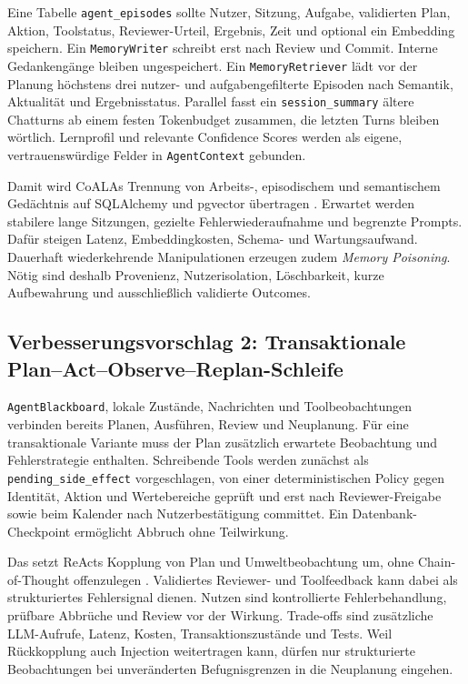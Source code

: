 Eine Tabelle \texttt{agent\_episodes} sollte Nutzer, Sitzung, Aufgabe,
validierten Plan, Aktion, Toolstatus, Reviewer-Urteil, Ergebnis, Zeit und
optional ein Embedding speichern. Ein \texttt{MemoryWriter} schreibt erst nach
Review und Commit. Interne Gedankengänge bleiben ungespeichert. Ein
\texttt{Memory\allowbreak{}Retriever}
lädt vor der Planung höchstens drei nutzer- und aufgabengefilterte Episoden nach
Semantik, Aktualität und Ergebnisstatus. Parallel fasst ein
\texttt{session\_summary} ältere Chatturns ab einem festen Tokenbudget zusammen,
die letzten Turns bleiben wörtlich. Lernprofil und relevante Confidence Scores
werden als eigene, vertrauenswürdige Felder in \texttt{AgentContext} gebunden.

Damit wird CoALAs Trennung von Arbeits-, episodischem und semantischem
Gedächtnis auf SQLAlchemy und pgvector übertragen \parencite{sumersEtAl2024}.
Erwartet werden stabilere lange Sitzungen, gezielte Fehlerwiederaufnahme und
begrenzte Prompts. Dafür steigen Latenz, Embeddingkosten, Schema- und
Wartungsaufwand. Dauerhaft wiederkehrende Manipulationen erzeugen zudem
\emph{Memory Poisoning}. Nötig sind deshalb Provenienz, Nutzerisolation,
Löschbarkeit, kurze Aufbewahrung und ausschließlich validierte Outcomes.

\subsection{Verbesserungsvorschlag 2: Transaktionale Plan--Act--Observe--Replan-Schleife}
\label{sec:verbesserung-zwei}

\texttt{AgentBlackboard}, lokale Zustände, Nachrichten und Toolbeobachtungen
verbinden bereits Planen, Ausführen, Review und Neuplanung. Für eine
transaktionale Variante muss der Plan zusätzlich erwartete Beobachtung und
Fehlerstrategie enthalten. Schreibende Tools werden zunächst als
\texttt{pending\_side\_effect} vorgeschlagen, von einer
deterministischen Policy gegen Identität, Aktion und Wertebereiche geprüft und
erst nach Reviewer-Freigabe sowie beim Kalender nach Nutzerbestätigung
committet. Ein Datenbank-Checkpoint ermöglicht Abbruch ohne Teilwirkung.

Das setzt ReActs Kopplung von Plan und Umweltbeobachtung um, ohne
Chain-of-Thought offenzulegen \parencite{yaoEtAl2023react}. Validiertes Reviewer-
und Toolfeedback kann dabei als strukturiertes Fehlersignal dienen. Nutzen sind kontrollierte Fehlerbehandlung,
prüfbare Abbrüche und Review vor der Wirkung. Trade-offs sind zusätzliche
LLM-Aufrufe, Latenz, Kosten, Transaktionszustände und Tests. Weil Rückkopplung
auch Injection weitertragen kann, dürfen nur strukturierte Beobachtungen bei
unveränderten Befugnisgrenzen in die Neuplanung eingehen.

